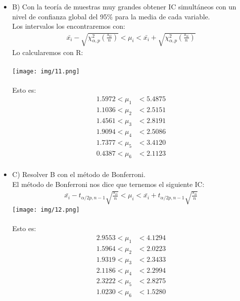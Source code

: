 \begin{sol}
\begin{itemize}
\item B) Con la teoría de muestras muy grandes obtener IC simultáneos con un nivel de confianza global del 95\% para la media de cada variable.\\
Los intervalos los encontraremos con:
\begin{align*}
\bar{x_i}-\sqrt{\chi_{\alpha,p}^2(\frac{s_{ii}}{n})} < \mu_i < \bar{x_i}+\sqrt{\chi_{\alpha,p}^2(\frac{s_{ii}}{n})}
\end{align*}
Lo calcularemos con R:\\\\
\texttt{[image: img/11.png]}\\\\
Esto es: 
\begin{align*}
 1.5972 < \mu_1 &< 5.4875 \\
 1.1036 < \mu_2 &< 2.5151 \\
 1.4561 < \mu_3 &< 2.8191 \\
 1.9094 < \mu_4 &< 2.5086 \\
 1.7377 < \mu_5 &< 3.4120 \\
 0.4387 < \mu_6 &< 2.1123 \\
\end{align*} \pagebreak
\item C) Resolver B con el método de Bonferroni. \\
El método de Bonferroni nos dice que ternemos el siguiente IC:
\begin{align*}
\bar{x_i}-t_{\alpha / 2p,n-1}\sqrt{\frac{s_{ii}}{n}}<\mu_i<\bar{x_i}+t_{\alpha / 2p,n-1}\sqrt{\frac{s_{ii}}{n}}
\end{align*}
\texttt{[image: img/12.png]}\\\\
Esto es:
\begin{align*}
2.9553 < \mu_1 &< 4.1294 \\
1.5964 < \mu_2 &< 2.0223 \\
1.9319 < \mu_3 &< 2.3433 \\
2.1186 < \mu_4 &< 2.2994 \\
2.3222 < \mu_5 &< 2.8275 \\
1.0230 < \mu_6 &< 1.5280 \\
\end{align*}

\end{itemize}
\end{sol}
